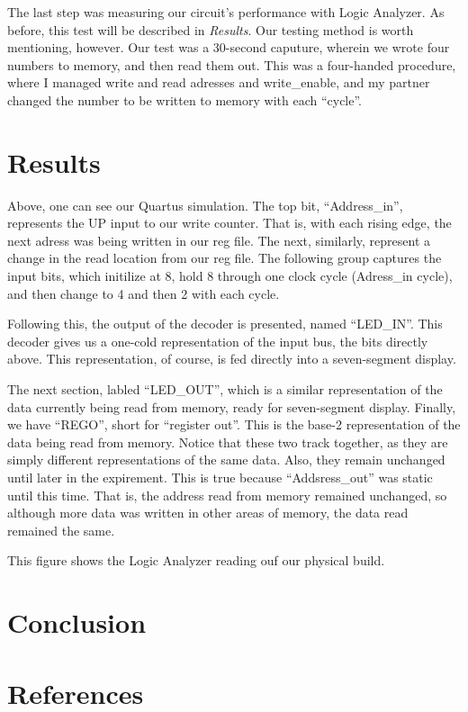 \documentclass[titlepage]{article}
\begin{document}
        The last step was measuring our circuit's performance with Logic Analyzer.  As before, this test will be described in \textit{Results}.  
        Our testing method is worth mentioning, however.
        Our test was a 30-second caputure, wherein we wrote four numbers to memory, and then read them out.  
        This was a four-handed procedure, where I managed write and read adresses and write_enable, and my partner changed the number to be written to memory with each ``cycle''.
        
        
    \section{Results}
        Above, one can see our Quartus simulation.  The top bit, ``Address_in'', represents the UP input to our write counter.
        That is, with each rising edge, the next adress was being written in our reg file.
        The next, similarly, represent a change in the read location from our reg file.
        The following group captures the input bits, which initilize at 8, hold 8 through one clock cycle (Adress_in cycle), and then change to 4 and then 2 with each cycle.
        
        Following this, the output of the decoder is presented, named ``LED_IN''.  This decoder gives us a one-cold representation of the input bus, the bits directly above.  This representation, of course, is fed directly into a seven-segment display.
        
        The next section, labled ``LED_OUT'', 
        which is a similar representation of the data currently being read from memory, ready for seven-segment display.
        Finally, we have ``REGO'', short for ``register out''.  This is the base-2 representation of the data being read from memory.
        Notice that these two track together, as they are simply different representations of the same data.
        Also, they remain unchanged until later in the expirement.  This is true because ``Addsress_out'' was static until this time.  That is, the address read from memory remained unchanged, so although more data was written in other areas of memory, the data read remained the same.
        
        This figure shows the Logic Analyzer reading ouf our physical build.
        
        
    \section{Conclusion}
        
    \section{References}
        
    
\end{document}
